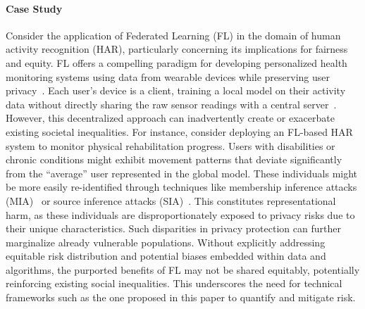 \paragraph{\textbf{Case Study}} Consider the application of Federated Learning (FL) in the domain of human activity recognition (HAR), particularly concerning its implications for fairness and equity. FL offers a compelling paradigm for developing personalized health monitoring systems using data from wearable devices while preserving user privacy~\cite{rieke2020future,poulain2023improving}. Each user's device is a client, training a local model on their activity data without directly sharing the raw sensor readings with a central server~\cite{BG_Survey2}. However, this decentralized approach can inadvertently create or exacerbate existing societal inequalities. For instance, consider deploying an FL-based HAR system to monitor physical rehabilitation progress. Users with disabilities or chronic conditions might exhibit movement patterns that deviate significantly from the ``average'' user represented in the global model. These individuals might be more easily re-identified through techniques like membership inference attacks (MIA)~\cite{shokri2017membership} or source inference attacks (SIA)~\cite{BG_SIA_2}. This constitutes representational harm, as these individuals are disproportionately exposed to privacy risks due to their unique characteristics. Such disparities in privacy protection can further marginalize already vulnerable populations. Without explicitly addressing equitable risk distribution and potential biases embedded within data and algorithms, the purported benefits of FL may not be shared equitably, potentially reinforcing existing social inequalities. This underscores the need for technical frameworks such as the one proposed in this paper to quantify and mitigate risk.

